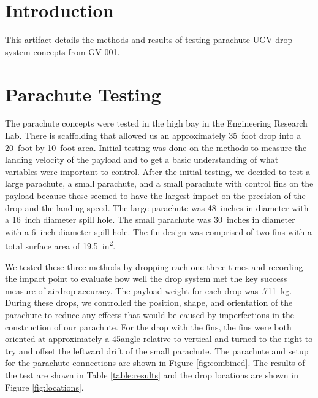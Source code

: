 \documentclass[]{auvsi_doc}
\begin{document}
\begin{AUVSITitlePage}
\begin{artifacttable}
\end{artifacttable}
\end{AUVSITitlePage}

\section{Introduction}
This artifact details the methods and results of testing parachute UGV drop system concepts from GV-001.

\section{Parachute Testing}
The parachute concepts were tested in the high bay in the Engineering Research Lab. There is scaffolding that allowed us an approximately 35~foot drop into a 20~foot by 10~foot area. Initial testing was done on the methods to measure the landing velocity of the payload and to get a basic understanding of what variables were important to control. After the initial testing, we decided to test a large parachute, a small parachute, and a small parachute with control fins on the payload because these seemed to have the largest impact on the precision of the drop and the landing speed. The large parachute was 48~inches in diameter with a 16~inch diameter spill hole. The small parachute was 30~inches in diameter with a 6~inch diameter spill hole. The fin design was comprised of two fins with a total surface area of 19.5~in\textsuperscript{2}.

We tested these three methods by dropping each one three times and recording the impact point to evaluate how well the drop system met the key success measure of airdrop accuracy. The payload weight for each drop was .711~kg.  During these drops, we controlled the position, shape, and orientation of the parachute to reduce any effects that would be caused by imperfections in the construction of our parachute. For the drop with the fins, the fins were both oriented at approximately a 45\degree angle relative to vertical and turned to the right to try and offset the leftward drift of the small parachute. The parachute and setup for the parachute connections are shown in Figure \ref{fig:combined}. The results of the test are shown in Table \ref{table:results} and the drop locations are shown in Figure \ref{fig:locations}.
\end{document}
